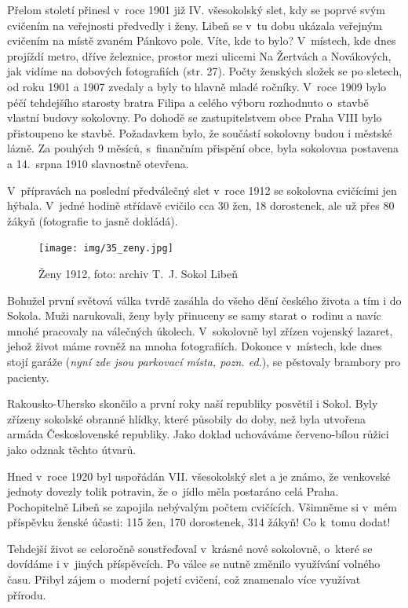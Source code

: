 \documentclass[a5paper, 11pt, twoside]{article}
\begin{document}
Přelom století přinesl v~roce 1901 již IV. všesokolský slet, kdy se
poprvé svým cvičením na veřejnosti předvedly i ženy. Libeň se v~tu dobu
ukázala veřejným cvičením na místě zvaném Pánkovo pole. Víte, kde to
bylo? V~místech, kde dnes projíždí metro, dříve železnice, prostor mezi
ulicemi Na Žertvách a Novákových, jak vidíme na dobových fotografiích (str. 27). %
Počty ženských složek se po sletech, od roku 1901 a 1907 zvedaly a byly
to hlavně mladé ročníky. V~roce 1909 bylo péčí tehdejšího starosty
bratra Filipa a celého výboru rozhodnuto o~stavbě vlastní budovy
sokolovny. Po dohodě se zastupitelstvem obce Praha VIII bylo přistoupeno
ke stavbě. Požadavkem bylo, že součástí sokolovny budou i městské lázně.
Za pouhých 9 měsíců, s~finančním přispění obce, byla sokolovna postavena
a 14.~srpna 1910 slavnostně otevřena.

V~přípravách na poslední předválečný slet v~roce 1912 se sokolovna
cvičícími jen hýbala. V~jedné hodině střídavě cvičilo cca 30 žen, 18
dorostenek, ale už přes 80 žákyň (fotografie to jasně dokládá).

\begin{figure}[h!]
  \centering 
  \texttt{[image: img/35\_zeny.jpg]}
  \caption*{Ženy 1912, foto: archiv T.~J. Sokol Libeň}
\end{figure}

Bohužel první světová válka tvrdě zasáhla do všeho dění českého života a
tím i do Sokola. Muži narukovali, ženy byly přinuceny se samy starat
o~rodinu a navíc mnohé pracovaly na válečných úkolech. V~sokolovně byl
zřízen vojenský lazaret, jehož život máme rovněž na mnoha fotografiích.
Dokonce v~místech, kde dnes stojí garáže (\textit{nyní zde jsou parkovací
místa, pozn. ed.}), se pěstovaly brambory pro pacienty.

Rakousko-Uhersko skončilo a první roky naší republiky posvětil i Sokol.
Byly zřízeny sokolské obranné hlídky, které působily do doby, než byla
utvořena armáda Československé republiky. Jako doklad uchováváme
červeno-bílou růžici jako odznak těchto útvarů.

Hned v~roce 1920 byl uspořádán VII. všesokolský slet a je známo, že
venkovské jednoty dovezly tolik potravin, že o~jídlo měla postaráno celá
Praha. Pochopitelně Libeň se zapojila nebývalým počtem cvičících.
Všimněme si v~mém příspěvku ženské účasti: 115 žen, 170 dorostenek, 314
žákyň! Co k~tomu dodat!

Tehdejší život se celoročně soustřeďoval v~krásné nové sokolovně,
o~které se dovídáme i v~jiných příspěvcích. Po válce se nutně změnilo
využívání volného času. Přibyl zájem o~moderní pojetí cvičení, což
znamenalo více využívat přírodu.
\end{document}
